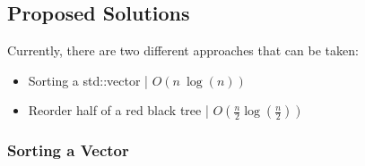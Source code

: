 \documentclass{article}
\begin{document}
\newpage

\subsection{Proposed Solutions}

Currently, there are two different approaches that can be taken:
\begin{itemize}
\item Sorting a std::vector | $O(n \: \log(n))$
\item Reorder half of a red black tree | $O(\frac{n}{2}\log(\frac{n}{2}))$
\end{itemize}

\subsubsection{Sorting a Vector}
\end{document}

